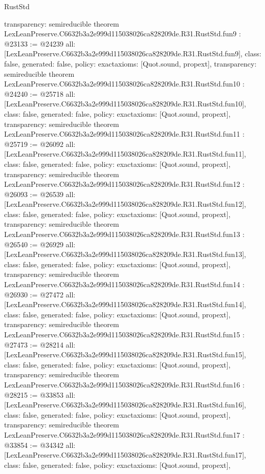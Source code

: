 \begin{lexlean}{RustStd}
\begin{coremodule}
{  transparency: semireducible
}
theorem LexLeanPreserve.C6632b3a2e999d115038026ca828209de.R31.RustStd.fun9 : @23133 := @24239 {
  all: [LexLeanPreserve.C6632b3a2e999d115038026ca828209de.R31.RustStd.fun9],
  class: false,
  generated: false,
  policy: exact{axioms: [Quot.sound, propext]},
  transparency: semireducible
}
theorem LexLeanPreserve.C6632b3a2e999d115038026ca828209de.R31.RustStd.fun10 : @24240 := @25718 {
  all: [LexLeanPreserve.C6632b3a2e999d115038026ca828209de.R31.RustStd.fun10],
  class: false,
  generated: false,
  policy: exact{axioms: [Quot.sound, propext]},
  transparency: semireducible
}
theorem LexLeanPreserve.C6632b3a2e999d115038026ca828209de.R31.RustStd.fun11 : @25719 := @26092 {
  all: [LexLeanPreserve.C6632b3a2e999d115038026ca828209de.R31.RustStd.fun11],
  class: false,
  generated: false,
  policy: exact{axioms: [Quot.sound, propext]},
  transparency: semireducible
}
theorem LexLeanPreserve.C6632b3a2e999d115038026ca828209de.R31.RustStd.fun12 : @26093 := @26539 {
  all: [LexLeanPreserve.C6632b3a2e999d115038026ca828209de.R31.RustStd.fun12],
  class: false,
  generated: false,
  policy: exact{axioms: [Quot.sound, propext]},
  transparency: semireducible
}
theorem LexLeanPreserve.C6632b3a2e999d115038026ca828209de.R31.RustStd.fun13 : @26540 := @26929 {
  all: [LexLeanPreserve.C6632b3a2e999d115038026ca828209de.R31.RustStd.fun13],
  class: false,
  generated: false,
  policy: exact{axioms: [Quot.sound, propext]},
  transparency: semireducible
}
theorem LexLeanPreserve.C6632b3a2e999d115038026ca828209de.R31.RustStd.fun14 : @26930 := @27472 {
  all: [LexLeanPreserve.C6632b3a2e999d115038026ca828209de.R31.RustStd.fun14],
  class: false,
  generated: false,
  policy: exact{axioms: [Quot.sound, propext]},
  transparency: semireducible
}
theorem LexLeanPreserve.C6632b3a2e999d115038026ca828209de.R31.RustStd.fun15 : @27473 := @28214 {
  all: [LexLeanPreserve.C6632b3a2e999d115038026ca828209de.R31.RustStd.fun15],
  class: false,
  generated: false,
  policy: exact{axioms: [Quot.sound, propext]},
  transparency: semireducible
}
theorem LexLeanPreserve.C6632b3a2e999d115038026ca828209de.R31.RustStd.fun16 : @28215 := @33853 {
  all: [LexLeanPreserve.C6632b3a2e999d115038026ca828209de.R31.RustStd.fun16],
  class: false,
  generated: false,
  policy: exact{axioms: [Quot.sound, propext]},
  transparency: semireducible
}
theorem LexLeanPreserve.C6632b3a2e999d115038026ca828209de.R31.RustStd.fun17 : @33854 := @34342 {
  all: [LexLeanPreserve.C6632b3a2e999d115038026ca828209de.R31.RustStd.fun17],
  class: false,
  generated: false,
  policy: exact{axioms: [Quot.sound, propext]},
}
\end{coremodule}
\end{lexlean}
